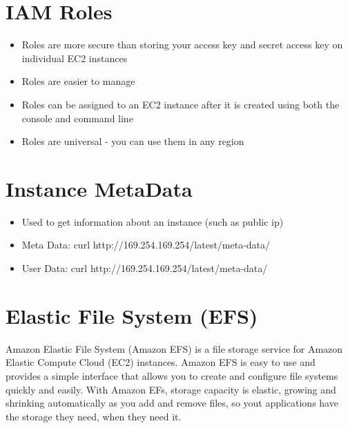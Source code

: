 \documentclass{article}
\begin{document}
\section{IAM Roles}
\begin{itemize}
\item
Roles are more secure than storing your access key and secret access key on individual EC2 instances

\item
Roles are easier to manage

\item
Roles can be assigned to an EC2 instance after it is created using both the console and command line

\item
Roles are universal - you can use them in any region
\end{itemize}

\section{Instance MetaData}
\begin{itemize}
\item
Used to get information about an instance (such as public ip)

\item
Meta Data: curl http://169.254.169.254/latest/meta-data/

\item
User Data: curl http://169.254.169.254/latest/meta-data/
\end{itemize}

\section{Elastic File System (EFS)}
Amazon Elastic File System (Amazon EFS) is a file storage service for Amazon Elastic Compute Cloud (EC2) instances. Amazon EFS is easy to use and provides a simple interface that allows you to create and configure file systems quickly and easily. With Amazon EFs, storage capacity is elastic, growing and shrinking automatically as you add and remove files, so yout applications have the storage they need, when they need it.
\end{document}
